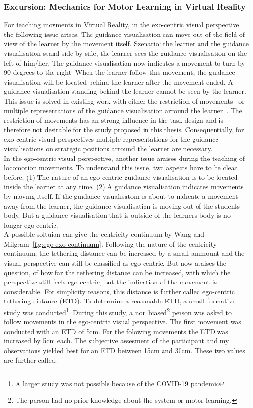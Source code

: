 \subsubsection{Excursion: Mechanics for Motor Learning in Virtual Reality}
For teaching movments in Virtual Reality, in the exo-centric visual perspective the following issue arises. The guidance visualisation can move out of the field of view of the learner by the movement itself. Szenario: the learner and the guidance visualisation stand side-by-side, the learner sees the guidance visualisation on the left of him/her. The guidance visualisation now indicates a movement to turn by 90 degrees to the right. When the learner follow this movement, the guidance visualisation will be located behind the learner after the movement ended. A guidance visualisation standing behind the learner cannot be seen by the learner.\\
This issue is solved in existing work with either the restriction of movements~\cite{freethrowsimulator,elearningma} or multiple representations of the guidance visualisation arround the learner~\cite{thaichichua,mythaichicoaches}. The restriction of movements has an strong influence in the task design and is therefore not desirable for the study proposed in this thesis. Consequentially, for exo-centric visual perspectives multiple representations for the guidance visualisations on strategic positions arround the learner are necessary.\\
In the ego-centric visual perspective, another issue araises during the teaching of locomotion movements. To understand this issue, two aspects have to be clear before. (1) The nature of an ego-centric guidance visualisation is to be located inside the learner at any time. (2) A guidance visualisation indicates movements by moving itself. If the guidance visualisatoin is about to indicate a movement away from the learner, the guidance visualisation is moving out of the students body. But a guidance visualisation that is outside of the learners body is no longer ego-centric.\\
A possible soltuion can give the centricity continuum by Wang and Milgram~\ref{fig:ego-exo-continuum}. Following the nature of the centricity continuum, the tethering distance can be increased by a small ammount and the visual perspective can still be classified as ego-centric. But now araises the question, of how far the tethering distance can be increased, with which the perspective still feels ego-centric, but the indication of the movement is considerable. For simplicity reasons, this distance is further called ego-centric tethering distance (ETD). To determine a reasonable ETD, a small formative study was conducted\footnote{A larger study was not possible because of the COVID-19 pandemic}. During this study, a non biased\footnote{The person had no prior knowledge about the system or motor learning.} person was asked to follow movements in the ego-centric visual perspective. The first movement was conducted with an ETD of 5cm. For the folowing movements the ETD was increased by 5cm each. The subjective assesment of the participant and my observations yielded best for an ETD between 15cm and 30cm. These two values are further called:
